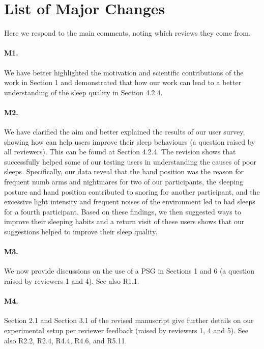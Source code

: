 \section*{List of Major Changes}

Here we respond to the main comments, noting which reviews they come from.

\paragraph{M1.} We have better highlighted the motivation and scientific contributions of the work in Section 1 and demonstrated that how our work can lead to
a better understanding of the sleep quality in Section 4.2.4.

\paragraph{M2.} We have clarified the aim and better explained the results of our user survey, showing how \systemname can help users
improve their sleep behaviours (a question raised by all reviewers). This can be found at Section 4.2.4. The revision shows that
\systemname successfully helped some of our testing users in understanding the causes of poor sleeps. Specifically, our data reveal that
the hand position was the reason for frequent numb arms and nightmares for two of our participants, the sleeping posture and hand position
contributed to snoring for another participant, and the excessive light intensity and frequent noises of the environment led to bad sleeps
for a fourth participant. Based on these findings, we then suggested ways to improve their sleeping habits and a return visit of these
users shows that our suggestions helped to improve their sleep quality.

\paragraph{M3.} We now provide discussions on the use of a PSG in Sections 1 and 6 (a question raised by reviewers 1 and 4). See also R1.1.

\paragraph{M4.} Section 2.1 and Section 3.1 of the revised manuscript give further details on our experimental setup per reviewer feedback (raised by reviewers 1, 4 and 5). See also R2.2, R2.4, R4.4, R4.6, and R5.11.

